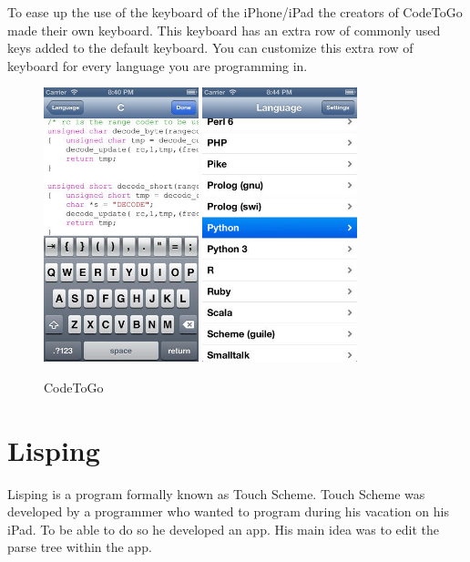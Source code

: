 \documentclass[a4paper,12pt]{report}
\begin{document}
To ease up the use of the keyboard of the iPhone/iPad the creators of CodeToGo made their own keyboard. This keyboard has an extra row of commonly used keys added to the default keyboard. 
You can customize this extra row of keyboard for every language you are programming in.
\begin{figure}
  \centering
    \includegraphics[width=0.40\textwidth]{images/codetogo1.jpeg}
     \includegraphics[width=0.40\textwidth]{images/codetogo2.jpeg}
  \caption{CodeToGo}
\end{figure}


\section{Lisping}
Lisping is a program formally known as Touch Scheme. Touch Scheme was developed by a programmer who wanted to program during his vacation on his iPad. To be able to do so he developed an app. 
His main idea was to edit the parse tree within the app.
\end{document}
